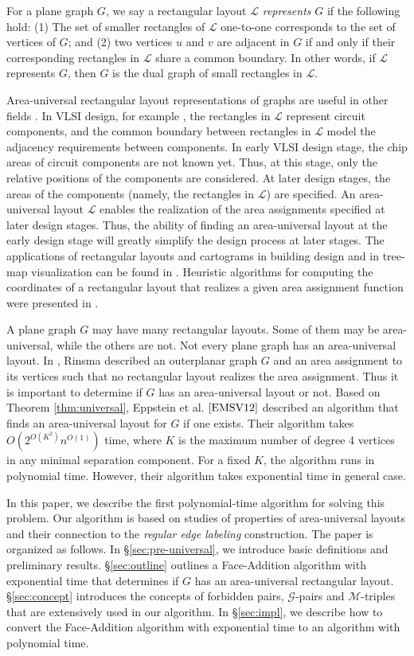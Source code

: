 \documentclass[11pt]{article}
\newcommand{\LL}{\mathcal{L}}
\newcommand{\MM}{\mathcal{M}}
\newcommand{\GG}{\mathcal{G}}
\begin{document}
For a plane graph $G$, we say a rectangular layout $\LL$ {\em represents}
$G$ if the following hold: (1) The set of smaller rectangles of $\LL$
one-to-one corresponds to the set of vertices of $G$; and
(2) two vertices $u$ and $v$ are adjacent in $G$ if and only if their
corresponding rectangles in $\LL$ share a common boundary. In other words,
if $\LL$ represents $G$, then $G$ is the dual graph of small rectangles in $\LL$.

Area-universal rectangular layout representations of graphs are useful
in other fields \cite{Mu08}. In VLSI design, for example \cite{YS95},
the rectangles in $\LL$ represent circuit components, and the common
boundary between rectangles in $\LL$ model the adjacency requirements
between components. In early VLSI design stage, the chip areas of circuit
components are not known yet. Thus, at this stage, only the relative
positions of the components are considered. At later design stages, the
areas of the components (namely, the rectangles in $\LL$) are specified.
An area-universal layout $\LL$ enables the realization of the area
assignments specified at later design stages. Thus, the ability of
finding an area-universal layout at the early
design stage will greatly simplify the design process at later stages.
The applications of rectangular layouts and cartograms in building design
and in tree-map visualization can be found in \cite{EM79,BHW00}.
Heuristic algorithms for computing the coordinates of a rectangular layout
that realizes a given area assignment function were presented in \cite{WKC88,KS07}.

A plane graph $G$ may have many rectangular layouts. Some of them
may be area-universal, while the others are not. Not every plane graph
has an area-universal layout. In \cite{Ri87}, Rinsma described an
outerplanar graph $G$ and an area assignment to its vertices such that
no rectangular layout realizes the area assignment.
Thus it is important to determine if $G$ has an area-universal layout
or not. Based on Theorem \ref{thm:universal}, Eppstein et al.
$\cite{EMSV12}$ described an algorithm that finds an area-universal
layout for $G$ if one exists. Their algorithm takes $O(2^{O(K^2)}n^{O(1)})$
time, where $K$ is the maximum number of degree 4 vertices in any minimal
separation component. For a fixed $K$, the algorithm runs in polynomial
time. However, their algorithm takes exponential time in general case.

In this paper, we describe the first polynomial-time algorithm for
solving this problem. Our algorithm is based on studies of properties of
area-universal layouts and their connection to the {\em regular edge
labeling} construction.
The paper is organized as follows. In \S \ref{sec:pre-universal}, we introduce
basic definitions and preliminary results. \S \ref{sec:outline} outlines
a Face-Addition algorithm with exponential time that determines if $G$
has an area-universal rectangular layout. \S \ref{sec:concept} introduces the
concepts of forbidden pairs, $\GG$-pairs and $\MM$-triples that are extensively used
in our algorithm. In \S \ref{sec:impl}, we describe how to convert
the Face-Addition algorithm with exponential time to an algorithm with
polynomial time.
\end{document}
